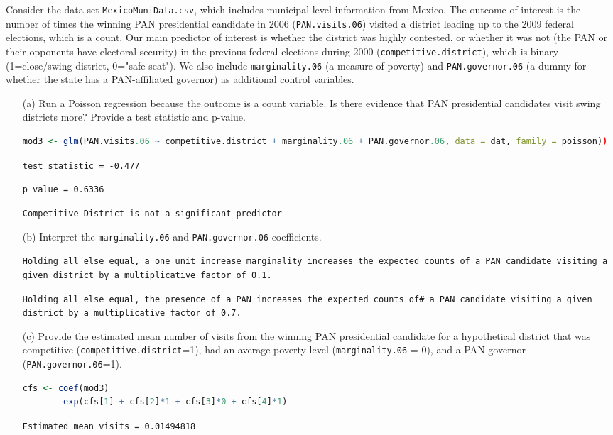 \documentclass[12pt,letterpaper]{article}
\begin{document}
\noindent Consider the data set \texttt{MexicoMuniData.csv}, which includes municipal-level information from Mexico. The outcome of interest is the number of times the winning PAN presidential candidate in 2006 (\texttt{PAN.visits.06}) visited a district leading up to the 2009 federal elections, which is a count. Our main predictor of interest is whether the district was highly contested, or whether it was not (the PAN or their opponents have electoral security) in the previous federal elections during 2000 (\texttt{competitive.district}), which is binary (1=close/swing district, 0="safe seat"). We also include \texttt{marginality.06} (a measure of poverty) and \texttt{PAN.governor.06} (a dummy for whether the state has a PAN-affiliated governor) as additional control variables. 

\begin{enumerate}
	\item [(a)]
	Run a Poisson regression because the outcome is a count variable. Is there evidence that PAN presidential candidates visit swing districts more? Provide a test statistic and p-value.
	\begin{lstlisting}[language=R]
		mod3 <- glm(PAN.visits.06 ~ competitive.district + marginality.06 + PAN.governor.06, data = dat, family = poisson))\end{lstlisting}
	
	\texttt{test statistic = -0.477}
	
	\texttt{p value = 0.6336}
	
	\texttt{Competitive District is not a significant predictor}

	\item [(b)]
	Interpret the \texttt{marginality.06} and \texttt{PAN.governor.06} coefficients.
	
	\texttt{Holding all else equal, a one unit increase marginality increases the expected counts of a PAN candidate visiting a given district by a multiplicative factor of 0.1.}
	
	\texttt{Holding all else equal, the presence of a PAN increases the expected counts of# a PAN candidate visiting a given district by a multiplicative factor of 0.7.}
	
	\item [(c)]
	Provide the estimated mean number of visits from the winning PAN presidential candidate for a hypothetical district that was competitive (\texttt{competitive.district}=1), had an average poverty level (\texttt{marginality.06} = 0), and a PAN governor (\texttt{PAN.governor.06}=1).
	\begin{lstlisting}[language=R]
		cfs <- coef(mod3)
		exp(cfs[1] + cfs[2]*1 + cfs[3]*0 + cfs[4]*1)\end{lstlisting}
	\texttt{Estimated mean visits = 0.01494818}
	
\end{enumerate}
\end{document}
